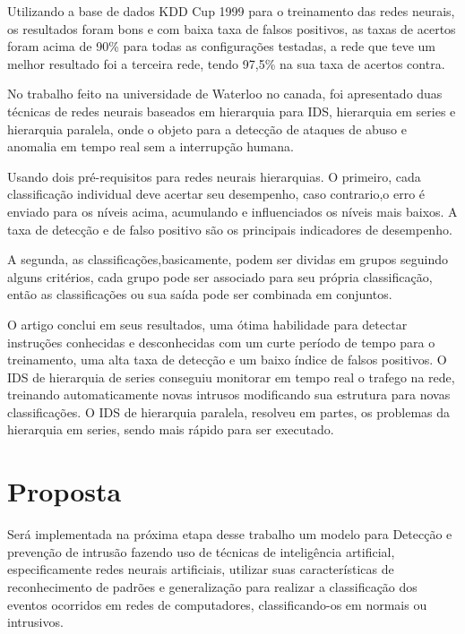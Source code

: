 \documentclass[
	12pt,				%
	openright,			%
	oneside,
	a4paper,			%
	english,			%
	french,				%
	spanish,			%
	brazil				%
	]{abntex2}
\begin{document}
Utilizando a base de dados KDD Cup 1999 para o treinamento das redes neurais, os resultados foram bons e com baixa taxa de falsos positivos, as taxas de acertos foram acima de 90\% para todas as configurações testadas, a rede que teve um melhor resultado foi a terceira rede, tendo 97,5\% na sua taxa de acertos contra.

No trabalho feito na universidade de Waterloo no canada\cite{Chunlin}, foi apresentado duas técnicas de redes neurais baseados em hierarquia para IDS, hierarquia em series e hierarquia paralela, onde o objeto para a detecção de ataques de abuso e anomalia em tempo real sem a interrupção humana.

Usando dois pré-requisitos para redes neurais hierarquias. O primeiro, cada classificação individual deve acertar seu desempenho, caso contrario,o erro é enviado para os níveis acima, acumulando e influenciados os níveis mais baixos. A taxa de detecção e de falso positivo são os principais indicadores de desempenho. 

A segunda, as classificações,basicamente, podem ser dividas em grupos seguindo alguns critérios, cada grupo pode ser associado para seu própria classificação, então as classificações ou sua saída pode ser combinada em conjuntos.

O artigo conclui em seus resultados, uma ótima habilidade para detectar instruções conhecidas e desconhecidas com um curte período de tempo para o treinamento, uma alta taxa de detecção e um baixo índice de falsos positivos.
O IDS de hierarquia de series conseguiu monitorar em tempo real o trafego na rede, treinando automaticamente novas intrusos modificando sua estrutura para novas classificações. O IDS de hierarquia paralela, resolveu em partes, os problemas da hierarquia em series, sendo mais rápido para ser executado.


\chapter[Proposta]{Proposta}

Será implementada na próxima etapa desse trabalho um modelo para Detecção e prevenção de intrusão fazendo uso de técnicas de inteligência artificial, especificamente redes neurais artificiais, utilizar suas características de reconhecimento de padrões e generalização para realizar a classificação dos eventos ocorridos em redes de computadores, classificando-os em normais ou intrusivos.
\end{document}
